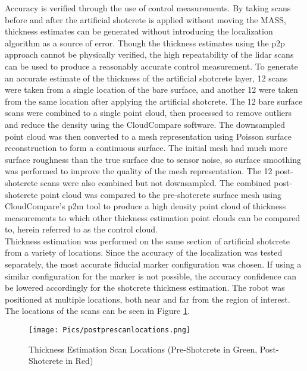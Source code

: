Accuracy is verified through the use of control measurements. By taking scans before and after the artificial shotcrete is applied without moving the MASS, thickness estimates can be generated without introducing the localization algorithm as a source of error. Though the thickness estimates using the \acrshort{p2p} approach cannot be physically verified, the high repeatability of the \acrshort{lidar} scans can be used to produce a reasonably accurate control measurement. To generate an accurate estimate of the thickness of the artificial shotcrete layer, 12 scans were taken from a single location of the bare surface, and another 12 were taken from the same location after applying the artificial shotcrete. The 12 bare surface scans were combined to a single point cloud, then processed to remove outliers and reduce the density using the CloudCompare software. The downsampled point cloud was then converted to a mesh representation using Poisson surface reconstruction to form a continuous surface. The initial mesh had much more surface roughness than the true surface due to sensor noise, so surface smoothing was performed to improve the quality of the mesh representation. The 12 post-shotcrete scans were also combined but not downsampled. The combined post-shotcrete point cloud was compared to the pre-shotcrete surface mesh using CloudCompare's \acrshort{p2m} tool to produce a high density point cloud of thickness measurements to which other thickness estimation point clouds can be compared to, herein referred to as the control cloud.\\

Thickness estimation was performed on the same section of artificial shotcrete from a variety of locations. Since the accuracy of the localization was tested separately, the most accurate fiducial marker configuration was chosen. If using a similar configuration for the marker is not possible, the accuracy confidence can be lowered accordingly for the shotcrete thickness estimation. The robot was positioned at multiple locations, both near and far from the region of interest. The locations of the scans can be seen in Figure \ref{fig:thickscans}.\\

\begin{figure}
    \centering
    \texttt{[image: Pics/postprescanlocations.png]}
    \caption{Thickness Estimation Scan Locations (Pre-Shotcrete in Green, Post-Shotcrete in Red)}
    \label{fig:thickscans}
\end{figure}

